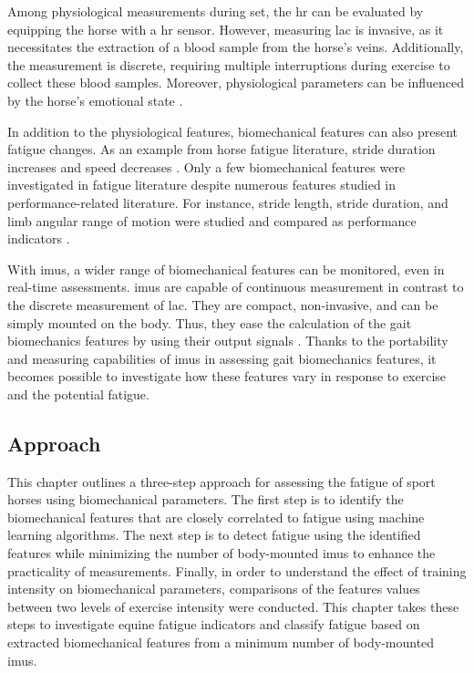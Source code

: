 Among physiological measurements during \gls{set}, the \gls{hr} can be evaluated by equipping the horse with a \gls{hr} sensor. However, measuring \gls{lac} is invasive, as it necessitates the extraction of a blood sample from the horse's veins. Additionally, the measurement is discrete, requiring multiple interruptions during exercise to collect these blood samples. Moreover, physiological parameters can be influenced by the horse's emotional state \cite{JANSEN200938}.

In addition to the physiological features, biomechanical features can also present fatigue changes. As an example from horse fatigue literature, stride duration increases and speed decreases \cite{Cottin2006EffectTraining,Colborne2001ElectromyographicStudy.,Williams2018ElectromyographyTechnology,Pugliese2020EffectStudy,Takahashi2021EffectsRaces}. Only a few biomechanical features were investigated in fatigue literature despite numerous features studied in performance-related literature. For instance, stride length, stride duration, and limb angular range of motion were studied and compared as performance indicators \cite{Barrey1999MethodsHorses,parkes_2019_the}. 

With \gls{imu}s, a wider range of biomechanical features can be monitored, even in real-time assessments. \gls{imu}s are capable of continuous measurement in contrast to the discrete measurement of \gls{lac}. They are compact, non-invasive, and can be simply mounted on the body. Thus, they ease the calculation of the gait biomechanics features by using their output signals \cite{456}. Thanks to the portability and measuring capabilities of \gls{imu}s in assessing gait biomechanics features, it becomes possible to investigate how these features vary in response to exercise and the potential fatigue.

\subsection{Approach}
This chapter outlines a three-step approach for assessing the fatigue of sport horses using biomechanical parameters. The first step is to identify the biomechanical features that are closely correlated to fatigue using machine learning algorithms. The next step is to detect fatigue using the identified features while minimizing the number of body-mounted \gls{imu}s to enhance the practicality of measurements. Finally, in order to understand the effect of training intensity on biomechanical parameters, comparisons of the features values between two levels of exercise intensity were conducted. This chapter takes these steps to investigate equine fatigue indicators and classify fatigue based on extracted biomechanical features from a minimum number of body-mounted \gls{imu}s.  